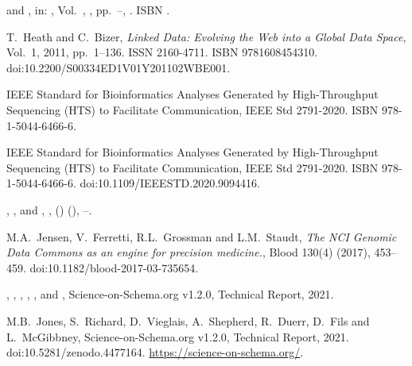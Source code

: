 \documentclass[ds,v1.1.2,openaccess]{iosart2x}%
\begin{document}
\begin{thebibliography}{}
%
\begin{bchapter}
 and
,
in: ,
Vol.~,
,
pp.~--,
.
ISBN .
\end{bchapter}
%
\OrigBibText
T.~Heath and
C.~Bizer,
\textit{Linked Data: Evolving the Web into a Global Data Space},
Vol.~1,
2011,
pp.~1--136.
ISSN 2160-4711.
ISBN 9781608454310.
doi:10.2200/S00334ED1V01Y201102WBE001.
\endOrigBibText
{}
\endbibitem

%
\begin{botherref}
IEEE Standard for Bioinformatics Analyses Generated by High-Throughput
Sequencing (HTS) to Facilitate Communication,
IEEE Std 2791-2020.
ISBN 978-1-5044-6466-6.
\end{botherref}
%
\OrigBibText
IEEE Standard for Bioinformatics Analyses Generated by High-Throughput
Sequencing (HTS) to Facilitate Communication,
IEEE Std 2791-2020.
ISBN 978-1-5044-6466-6.
doi:10.1109/IEEESTD.2020.9094416.
\endOrigBibText
{}
\endbibitem

%
\begin{barticle}
,
,
 and
,
,
()
(),
--.
\end{barticle}
%
\OrigBibText
M.A.~Jensen,
V.~Ferretti,
R.L.~Grossman and
L.M.~Staudt,
\textit{The {NCI} Genomic Data Commons as an engine for precision medicine.},
Blood
130(4)
(2017),
453--459.
doi:10.1182/blood-2017-03-735654.
\endOrigBibText
{}
\endbibitem

%
\begin{botherref}
,
,
,
,
,
 and
,
Science-on-Schema.org v1.2.0, Technical Report,
2021.
\end{botherref}
%
\OrigBibText
M.B.~Jones,
S.~Richard,
D.~Vieglais,
A.~Shepherd,
R.~Duerr,
D.~Fils and
L.~McGibbney,
Science-on-Schema.org v1.2.0,
Technical Report,
2021.
doi:10.5281/zenodo.4477164.
\url{https://science-on-schema.org/}.
\endOrigBibText
{}
\endbibitem


\end{thebibliography}
\end{document}
